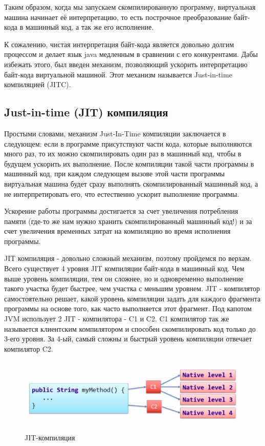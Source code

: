 \documentclass[]{scrartcl}
\begin{document}
Таким образом, когда мы запускаем скомпилированную программу, виртуальная машина начинает её интерпретацию, то есть построчное преобразование байт-кода в машинный код, а так же его исполнение.

К сожалению, чистая интерпретация байт-кода является довольно долгим процессом и делает язык java медленным в сравнении с его конкурентами. Дабы избежать этого, был введен механизм, позволяющий ускорить интерпретацию байт-кода виртуальной машиной. Этот механизм называется Just-in-time компиляцией (JITC).

\subsection{Just-in-time (JIT) компиляция}

Простыми словами, механизм Just-In-Time компиляции заключается в следующем: если в программе присутствуют части кода, которые выполняются много раз, то их можно скомпилировать один раз в машинный код, чтобы в будущем ускорить их выполнение. После компиляции такой части программы в машинный код, при каждом следующем вызове этой части программы виртуальная машина будет сразу выполнять скомпилированный машинный код, а не интерпретировать его, что естественно ускорит выполнение программы.

Ускорение работы программы достигается за счет увеличения потребления памяти (где-то же нам нужно хранить скомпилированный машинный код!) и за счет увеличения временных затрат на компиляцию во время исполнения программы.

JIT компиляция - довольно сложный механизм, поэтому пройдемся по верхам. Всего существует 4 уровня JIT компиляции байт-кода в машинный код. Чем выше уровень компиляции, тем он сложнее, но и одновременно выполнение такого участка будет быстрее, чем участка с меньшим уровнем. JIT - компилятор самостоятельно решает, какой уровень компиляции задать для каждого фрагмента программы на основе того, как часто выполняется этот фрагмент. Под капотом JVM использует 2 JIT - компилятора - C1 и C2. C1 компилятор так же называется клиентским компилятором и способен скомпилировать код только до 3-его уровня. За 4-ый, самый сложны и быстрый уровень компиляции отвечает компилятор C2.

\begin{figure}[h!]
	\includegraphics[width=\linewidth]{JIT.png}
	\caption{JIT-компиляция}
\end{figure}
\end{document}
